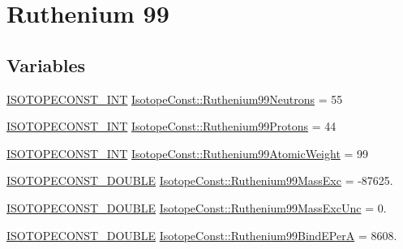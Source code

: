 \hypertarget{group___isotope_const-_ruthenium-_ru99}{}\section{Ruthenium 99}
\label{group___isotope_const-_ruthenium-_ru99}
\subsection*{Variables}
\begin{DoxyCompactItemize}
\item 
\mbox{\hyperlink{group___isotope_const-_macros_ga5f18360b3e99483a35c32d789e62621c}{I\+S\+O\+T\+O\+P\+E\+C\+O\+N\+S\+T\+\_\+\+I\+NT}} \mbox{\hyperlink{group___isotope_const-_ruthenium-_ru99_gaf3db43a412be594da0476027a81007a2}{Isotope\+Const\+::\+Ruthenium99\+Neutrons}} = 55
\item 
\mbox{\hyperlink{group___isotope_const-_macros_ga5f18360b3e99483a35c32d789e62621c}{I\+S\+O\+T\+O\+P\+E\+C\+O\+N\+S\+T\+\_\+\+I\+NT}} \mbox{\hyperlink{group___isotope_const-_ruthenium-_ru99_ga3524fa4fc739be2767a41ec1ba873f97}{Isotope\+Const\+::\+Ruthenium99\+Protons}} = 44
\item 
\mbox{\hyperlink{group___isotope_const-_macros_ga5f18360b3e99483a35c32d789e62621c}{I\+S\+O\+T\+O\+P\+E\+C\+O\+N\+S\+T\+\_\+\+I\+NT}} \mbox{\hyperlink{group___isotope_const-_ruthenium-_ru99_gaa92b6efa109be40cd9becfa7c058f8d4}{Isotope\+Const\+::\+Ruthenium99\+Atomic\+Weight}} = 99
\item 
\mbox{\hyperlink{group___isotope_const-_macros_ga8f45a7272ce02c0b4c65c44636ed719a}{I\+S\+O\+T\+O\+P\+E\+C\+O\+N\+S\+T\+\_\+\+D\+O\+U\+B\+LE}} \mbox{\hyperlink{group___isotope_const-_ruthenium-_ru99_ga35c21ad9e63c1d71b1936264ea892059}{Isotope\+Const\+::\+Ruthenium99\+Mass\+Exc}} = -\/87625.
\item 
\mbox{\hyperlink{group___isotope_const-_macros_ga8f45a7272ce02c0b4c65c44636ed719a}{I\+S\+O\+T\+O\+P\+E\+C\+O\+N\+S\+T\+\_\+\+D\+O\+U\+B\+LE}} \mbox{\hyperlink{group___isotope_const-_ruthenium-_ru99_ga90f1dad5e738c7765cc030ac1f861188}{Isotope\+Const\+::\+Ruthenium99\+Mass\+Exc\+Unc}} = 0.
\item 
\mbox{\hyperlink{group___isotope_const-_macros_ga8f45a7272ce02c0b4c65c44636ed719a}{I\+S\+O\+T\+O\+P\+E\+C\+O\+N\+S\+T\+\_\+\+D\+O\+U\+B\+LE}} \mbox{\hyperlink{group___isotope_const-_ruthenium-_ru99_ga87e1e3b97d72a29ffa3fcc1caa2116da}{Isotope\+Const\+::\+Ruthenium99\+Bind\+E\+PerA}} = 8608.
\item 

\end{DoxyCompactItemize}
